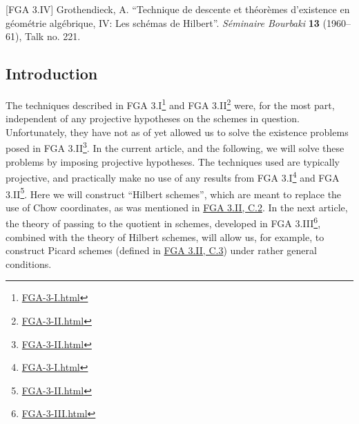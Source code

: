 \documentclass{article}
\renewcommand{\href}[2]{#2\footnote{\url{#1}}}
\newcommand{\oldpage}[1]{\marginpar{\footnotesize$\Big\vert$ \textit{p.~#1}}}
\theoremstyle{definition}
\theoremstyle{definition}
\theoremstyle{definition}
\theoremstyle{definition}
\theoremstyle{remark}
\begin{document}
\providecommand{\Tor}{\operatorname{Tor}}
\providecommand{\shTor}{\mathscr{T}\kern -.5pt or}
\providecommand{\Ext}{\operatorname{Ext}}
\providecommand{\shExt}{\mathscr{E}\kern -.5pt xt}
\providecommand{\Hom}{\operatorname{Hom}}
\providecommand{\shHom}{\mathscr{H}\kern -.5pt om}
\providecommand{\repHom}{\underline{\Hom}}
\providecommand{\supp}{\operatorname{supp}}
\providecommand{\red}{{\mathrm{red}}}
\providecommand{\OO}{\scr{O}}
\providecommand{\PP}{\mathbb{P}}
\providecommand{\Quot}{\operatorname{Quot}}
\providecommand{\shQuot}{\mathscr{Q}\kern -.5pt out}
\providecommand{\repQuot}{\underline{\Quot}}
\providecommand{\Grass}{\operatorname{Grass}}
\providecommand{\shGrass}{\mathscr{G}\kern -.5pt rass}
\providecommand{\repGrass}{\underline{\Grass}}
\providecommand{\Hilb}{\operatorname{Hilb}}
\providecommand{\shHilb}{\mathscr{H}\kern -.5pt ilb}
\providecommand{\repHilb}{\underline{\Hilb}}
\providecommand{\Pic}{\operatorname{Pic}}
\providecommand{\repPic}{\underline{\Pic}}
\providecommand{\repIsom}{\underline{\operatorname{Isom}}}
\providecommand{\repImm}{\underline{\operatorname{Imm}}}
\providecommand{\FXS}{{\scr{F}/X/S}}
\providecommand{\FXSp}{{\scr{F}'/X'/S'}}
\providecommand{\RR}{\operatorname{R}}
\providecommand{\rank}{\operatorname{rank}}
\providecommand{\Spec}{\operatorname{Spec}}
\providecommand{\Symm}{\operatorname{Symm}}

{[}FGA 3.IV{]}
Grothendieck, A.
``Technique de descente et théorèmes d'existence en géométrie algébrique, IV: Les schémas de Hilbert''.
\emph{Séminaire Bourbaki} \textbf{13} (1960--61), Talk no. 221.

\hypertarget{introduction-1}{%
\subsection*{Introduction}\label{introduction-1}}

\oldpage{221-01}The techniques described in \href{FGA-3-I.html}{FGA 3.I} and \href{FGA-3-II.html}{FGA 3.II} were, for the most part, independent of any projective hypotheses on the schemes in question.
Unfortunately, they have not as of yet allowed us to solve the existence problems posed in \href{FGA-3-II.html}{FGA 3.II}.
In the current article, and the following, we will solve these problems by imposing projective hypotheses.
The techniques used are typically projective, and practically make no use of any results from \href{FGA-3-I.html}{FGA 3.I} and \href{FGA-3-II.html}{FGA 3.II}.
Here we will construct ``Hilbert schemes'', which are meant to replace the use of Chow coordinates, as was mentioned in \protect\hyperlink{fga-3-ii-section-C.2}{FGA 3.II, C.2}.
In the next article, the theory of passing to the quotient in schemes, developed in \href{FGA-3-III.html}{FGA 3.III}, combined with the theory of Hilbert schemes, will allow us, for example, to construct Picard schemes (defined in \protect\hyperlink{fga-3-ii-section-C.3}{FGA 3.II, C.3}) under rather general conditions.
\end{document}
